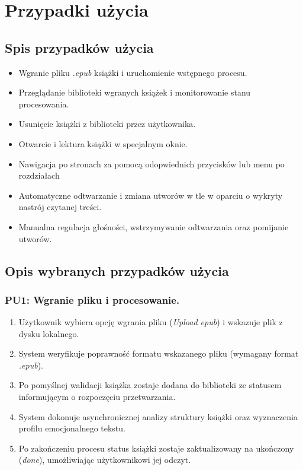 \section{Przypadki użycia}
\subsection{Spis przypadków użycia}
\begin{itemize}
      \item[\textbf{PU1:}] Wgranie pliku \textit{.epub} książki i uruchomienie wstępnego procesu.
      \item[\textbf{PU2:}] Przeglądanie biblioteki wgranych książek i monitorowanie stanu
      procesowania.
      \item[\textbf{PU3:}] Usunięcie książki z biblioteki przez użytkownika. 
      \item[\textbf{PU4:}] Otwarcie i lektura książki w specjalnym oknie.
      \item[\textbf{PU5:}] Nawigacja po stronach za pomocą odopwiednich przycisków lub menu po 
      rozdziałach
      \item[\textbf{PU6:}] Automatyczne odtwarzanie i zmiana utworów w tle w
      oparciu o wykryty nastrój czytanej treści.
      \item[\textbf{PU7:}] Manualna regulacja głośności, wstrzymywanie odtwarzania
        oraz pomijanie utworów.
\end{itemize}

\subsection{Opis wybranych przypadków użycia}
\subsubsection{PU1: Wgranie pliku i procesowanie.}
\begin{enumerate}
      \item Użytkownik wybiera opcję wgrania pliku (\textit{Upload epub}) i wskazuje plik z dysku 
      lokalnego.
      \item System weryfikuje poprawność formatu wskazanego pliku (wymagany format \textit{.epub}).
      \item Po pomyślnej walidacji książka zostaje dodana do biblioteki ze statusem informującym o 
      rozpoczęciu przetwarzania.
      \item System dokonuje asynchronicznej analizy struktury książki oraz wyznaczenia profilu 
      emocjonalnego tekstu.
      \item Po zakończeniu procesu status książki zostaje zaktualizowany na ukończony (\textit{done}),
      umożliwiając użytkownikowi jej odczyt.
\end{enumerate}

